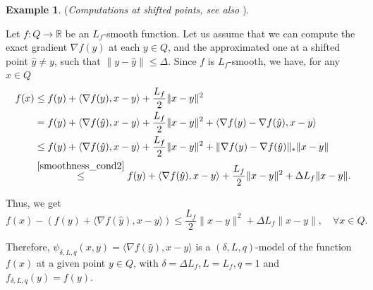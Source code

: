 \documentclass[11pt]{amsart}
\theoremstyle{definition}
\newtheorem{example}[theorem]{Example}
\numberwithin{equation}{section}
\begin{document}
\begin{example}\label{ex2_inexact}(\textit{Computations at shifted points, see also \cite{Devolder2013smooth}}). 

Let $f: Q \longrightarrow \mathbb{R}$ be an $L_f$-smooth function. Let us assume that we can compute the exact gradient $\nabla f(y)$ at each $y \in Q$,  and the approximated one at a shifted point $\hat{y} \ne y$, such that $\|y - \hat{y}\| \leq \Delta$.  Since $f$ is $L_f$-smooth, we have, for any $x \in Q$
\begin{align*}
    f(x) & \leq f(y) + \langle \nabla f(y), x - y \rangle + \frac{L_f}{2} \| x - y\|^2
    \\& = f(y) + \langle \nabla f(\hat{y}), x - y \rangle +  \frac{L_f}{2} \| x - y\|^2 + \langle \nabla f(y) - \nabla f(\hat{y}), x - y \rangle
    \\& \leq  f(y) + \langle \nabla f(\hat{y}), x - y \rangle +  \frac{L_f}{2} \| x - y\|^2 +  \| \nabla f(y) - \nabla f(\hat{y}) \|_*  \|x - y\|
    \\& \stackrel{\eqref{smoothness_cond2}}{\leq} f(y) + \langle \nabla f(\hat{y}), x - y \rangle +  \frac{L_f}{2} \| x - y\|^2 +  \Delta L_f  \|x - y\|.  
\end{align*}

Thus, we get 
\[
    f(x) - \left(f(y) + \langle \nabla f(\hat{y}), x - y \rangle\right) \leq \frac{L_f}{2} \| x - y\|^2 +  \Delta  L_f \|x - y\|, \quad \forall x \in Q. 
\]

Therefore, $\psi_{\delta, L, q} (x,y) =\langle \nabla f(\hat{y}), x - y \rangle $ is a $(\delta, L, q)$-model of the function $f(x)$ at a given point $y \in Q$, with $\delta = \Delta L_f, L = L_f, q = 1$ and $f_{\delta, L, q} (y) = f(y)$.
\end{example}
\end{document}
